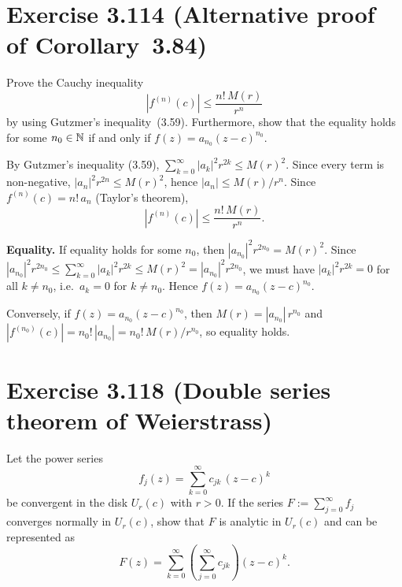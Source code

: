 \documentclass{article}
\begin{document}
\section{Exercise 3.114 (Alternative proof of Corollary~3.84)}

Prove the Cauchy inequality
\[
  |f^{(n)}(c)| \le \frac{n!\,M(r)}{r^n}
\]
by using Gutzmer's inequality~(3.59).
Furthermore, show that the equality holds for some
$n_0 \in \mathbb{N}$ if and only if $f(z) = a_{n_0}(z-c)^{n_0}$.

\begin{solution}
  By Gutzmer's inequality (3.59),
  $\sum_{k=0}^{\infty}|a_k|^2 r^{2k} \le M(r)^2$.
  Since every term is non-negative,
  $|a_n|^2 r^{2n} \le M(r)^2$, hence
  $|a_n| \le M(r)/r^n$.
  Since $f^{(n)}(c) = n!\,a_n$ (Taylor's theorem),
  \[
    |f^{(n)}(c)| \le \frac{n!\,M(r)}{r^n}.
  \]

  \textbf{Equality.}\;
  If equality holds for some $n_0$, then
  $|a_{n_0}|^2 r^{2n_0} = M(r)^2$.
  Since $|a_{n_0}|^2 r^{2n_0} \le \sum_{k=0}^{\infty}|a_k|^2 r^{2k}
  \le M(r)^2 = |a_{n_0}|^2 r^{2n_0}$,
  we must have $|a_k|^2 r^{2k} = 0$ for all $k \ne n_0$,
  i.e.\ $a_k = 0$ for $k \ne n_0$.
  Hence $f(z) = a_{n_0}(z-c)^{n_0}$.

  Conversely, if $f(z) = a_{n_0}(z-c)^{n_0}$, then
  $M(r) = |a_{n_0}|\,r^{n_0}$ and
  $|f^{(n_0)}(c)| = n_0!\,|a_{n_0}| = n_0!\,M(r)/r^{n_0}$,
  so equality holds.\qedhere
\end{solution}

\section{Exercise 3.118 (Double series theorem of Weierstrass)}

Let the power series
\[
  f_j(z) = \sum_{k=0}^{\infty} c_{jk}\,(z-c)^k
\]
be convergent in the disk $U_r(c)$ with $r > 0$.
If the series $F := \sum_{j=0}^{\infty} f_j$ converges normally
in $U_r(c)$, show that $F$ is analytic in $U_r(c)$ and can be
represented as
\[
  F(z) = \sum_{k=0}^{\infty}
  \left(\sum_{j=0}^{\infty} c_{jk}\right)(z-c)^k.
\]
\end{document}
